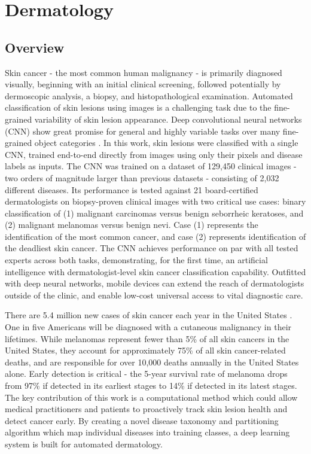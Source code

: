 \chapter{Dermatology}

\section{Overview}
Skin cancer - the most common human malignancy \cite{society2016cancer, rogers2015incidence, stern2010prevalence} - is primarily diagnosed visually, beginning with an initial clinical screening, followed potentially by dermoscopic analysis, a biopsy, and histopathological examination. Automated classification of skin lesions using images is a challenging task due to the fine-grained variability of skin lesion appearance. Deep convolutional neural networks (CNN) \cite{lecun2015deep, lecun1998handbook} show great promise for general and highly variable tasks over many fine-grained object categories \cite{russakovsky2015imagenet, krizhevsky2012imagenet, ioffe2015batch,  szegedy2016rethinking, szegedy2015going, he2016deep}. In this work, skin lesions were classified with a single CNN, trained end-to-end directly from images using only their pixels and disease labels as inputs. The CNN was trained on a dataset of 129,450 clinical images - two orders of magnitude larger than previous datasets \cite{masood2013computer} - consisting of 2,032 different diseases. Its performance is tested against 21 board-certified dermatologists on biopsy-proven clinical images with two critical use cases: binary classification of (1) malignant carcinomas versus benign seborrheic keratoses, and (2) malignant melanomas versus benign nevi. Case (1) represents the identification of the most common cancer, and case (2) represents identification of the deadliest skin cancer. The CNN achieves performance on par with all tested experts across both tasks, demonstrating, for the first time, an artificial intelligence with dermatologist-level skin cancer classification capability. Outfitted with deep neural networks, mobile devices can extend the reach of dermatologists outside of the clinic, and enable low-cost universal access to vital diagnostic care. 

There are 5.4 million new cases of skin cancer each year in the United States \cite{rogers2015incidence}. One in five Americans will be diagnosed with a cutaneous malignancy in their lifetimes. While melanomas represent fewer than 5\% of all skin cancers in the United States, they account for approximately 75\% of all skin cancer-related deaths, and are responsible for over 10,000 deaths annually in the United States alone. Early detection is critical - the 5-year survival rate of melanoma drops from 97\% if detected in its earliest stages to 14\% if detected in its latest stages. The key contribution of this work is a computational method which could allow medical practitioners and patients to proactively track skin lesion health and detect cancer early. By creating a novel disease taxonomy and partitioning algorithm which map individual diseases into training classes, a deep learning system is built for automated dermatology. 

